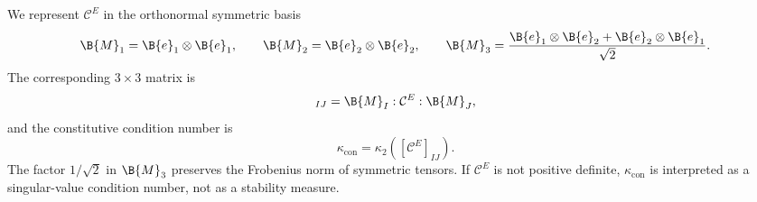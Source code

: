 We represent $\mathcal{C}^{E}$ in the orthonormal symmetric basis
\begin{equation}
    \B{M}_1=\B{e}_1\otimes\B{e}_1,
    \qquad
    \B{M}_2=\B{e}_2\otimes\B{e}_2,
    \qquad
    \B{M}_3=
    \frac{\B{e}_1\otimes\B{e}_2+\B{e}_2\otimes\B{e}_1}{\sqrt{2}}.
\end{equation}
The corresponding $3\times3$ matrix is
\begin{equation}
    [\mathcal{C}^{E}]_{IJ}
    =
    \B{M}_I:\mathcal{C}^{E}:\B{M}_J,
\end{equation}
and the constitutive condition number is
\begin{equation}
    \kappa_{\mathrm{con}}
    =
    \kappa_2([\mathcal{C}^{E}]_{IJ}).
\end{equation}
The factor $1/\sqrt{2}$ in $\B{M}_3$ preserves the Frobenius norm of symmetric
tensors. If $\mathcal{C}^{E}$ is not positive definite,
$\kappa_{\mathrm{con}}$ is interpreted as a singular-value condition number,
not as a stability measure.

